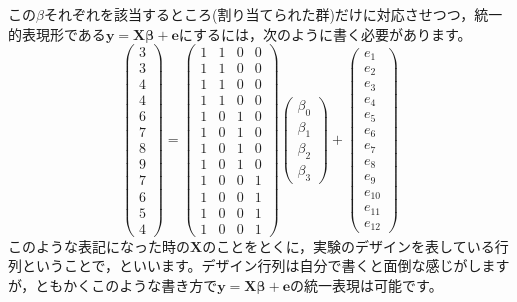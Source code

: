 \documentclass{ltjsbook}
\begin{document}
この$\beta$それぞれを該当するところ(割り当てられた群)だけに対応させつつ，統一的表現形である$\bm{y}=\bm{X\beta}+\bm{e}$にするには，次のように書く必要があります。
\[
	\begin{pmatrix}
		3 \\
		3 \\
		4 \\
		4 \\
		6 \\
		7 \\
		8 \\
		9 \\
		7 \\
		6 \\
		5 \\
		4
	\end{pmatrix}
	=
	\begin{pmatrix}
		1 & 1 & 0 & 0 \\
		1 & 1 & 0 & 0 \\
		1 & 1 & 0 & 0 \\
		1 & 1 & 0 & 0 \\
		1 & 0 & 1 & 0 \\
		1 & 0 & 1 & 0 \\
		1 & 0 & 1 & 0 \\
		1 & 0 & 1 & 0 \\
		1 & 0 & 0 & 1 \\
		1 & 0 & 0 & 1 \\
		1 & 0 & 0 & 1 \\
		1 & 0 & 0 & 1
	\end{pmatrix}
	\begin{pmatrix}
		\beta_0 \\
		\beta_1 \\
		\beta_2 \\
		\beta_3
	\end{pmatrix}+
	\begin{pmatrix}
		e_1    \\
		e_2    \\
		e_3    \\
		e_4    \\
		e_5    \\
		e_6    \\
		e_7    \\
		e_8    \\
		e_9    \\
		e_{10} \\
		e_{11} \\
		e_{12}
	\end{pmatrix}
\]
このような表記になった時の$\bm{X}$のことをとくに，実験のデザインを表している行列ということで，といいます。デザイン行列は自分で書くと面倒な感じがしますが，ともかくこのような書き方で$\bm{y}=\bm{X\beta}+\bm{e}$の統一表現は可能です。
\end{document}
